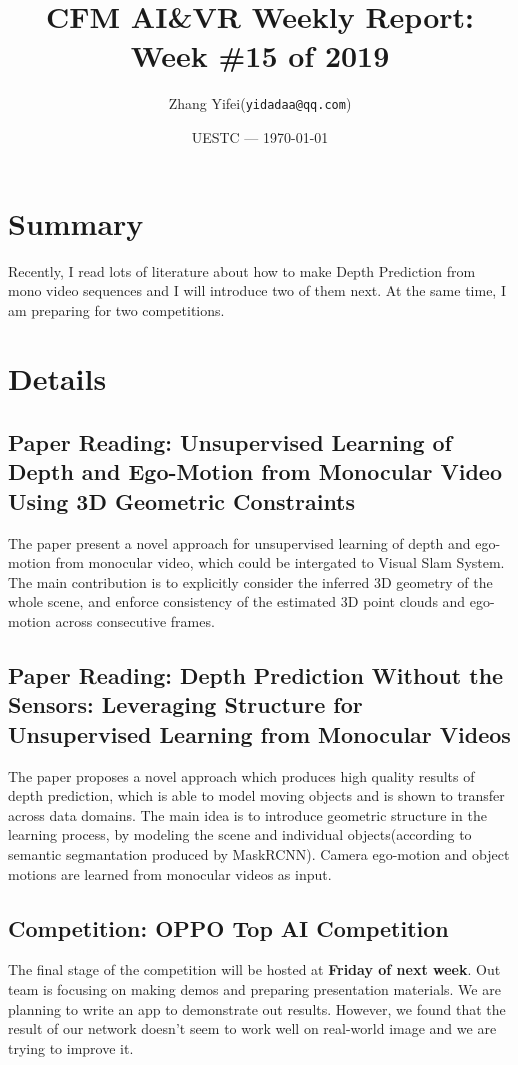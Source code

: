 \documentclass{article}
\title{CFM AI\&VR Weekly Report: Week \#15 of 2019}
\author{Zhang Yifei(\texttt{yidadaa@qq.com})}
\date{UESTC --- \today}
\begin{document}
 \maketitle

 \section{Summary}
 Recently, I read lots of literature about how to make Depth Prediction from mono video sequences and I will introduce two of them next. At the same time, I am preparing for two competitions.

 \section{Details}
 \subsection{Paper Reading: Unsupervised Learning of Depth and Ego-Motion from Monocular Video Using 3D Geometric Constraints}
 The paper present a novel approach for unsupervised learning of depth and ego-motion from monocular video, which could be intergated to Visual Slam System. The main contribution is to explicitly consider the inferred 3D geometry of the whole scene, and enforce consistency of the estimated 3D point clouds and ego-motion across consecutive frames.

 \subsection{Paper Reading: Depth Prediction Without the Sensors: Leveraging Structure for Unsupervised Learning from Monocular Videos}
 The paper proposes a novel approach which produces high quality results of depth prediction, which is able to model moving objects and is shown to transfer across data domains. The main idea is to introduce geometric structure in the learning process, by modeling the scene and individual objects(according to semantic segmantation produced by MaskRCNN). Camera ego-motion and object motions are learned from monocular videos as input.

 \subsection{Competition: OPPO Top AI Competition}
 The final stage of the competition will be hosted at \textbf{Friday of next week}. Out team is focusing on making demos and preparing presentation materials. We are planning to write an app to demonstrate out results. However, we found that the result of our network doesn't seem to work well on real-world image and we are trying to improve it.
\end{document}
